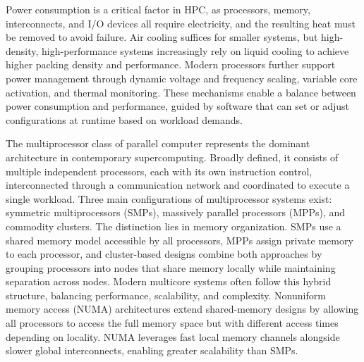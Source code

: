 Power consumption is a critical factor in HPC, as processors, memory, interconnects, and I/O devices all require electricity, and the resulting heat must be removed to avoid failure. Air cooling suffices for smaller systems, but high-density, high-performance systems increasingly rely on liquid cooling to achieve higher packing density and performance. Modern processors further support power management through dynamic voltage and frequency scaling, variable core activation, and thermal monitoring. These mechanisms enable a balance between power consumption and performance, guided by software that can set or adjust configurations at runtime based on workload demands.

The multiprocessor class of parallel computer represents the dominant architecture in contemporary supercomputing. Broadly defined, it consists of multiple independent processors, each with its own instruction control, interconnected through a communication network and coordinated to execute a single workload. Three main configurations of multiprocessor systems exist: symmetric multiprocessors (SMPs), massively parallel processors (MPPs), and commodity clusters. The distinction lies in memory organization. SMPs use a shared memory model accessible by all processors, MPPs assign private memory to each processor, and cluster-based designs combine both approaches by grouping processors into nodes that share memory locally while maintaining separation across nodes. Modern multicore systems often follow this hybrid structure, balancing performance, scalability, and complexity.
Nonuniform memory access (NUMA) architectures extend shared-memory designs by allowing all processors to access the full memory space but with different access times depending on locality. NUMA leverages fast local memory channels alongside slower global interconnects, enabling greater scalability than SMPs.


